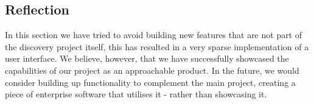 \subsection{Reflection}\label{subsec:reflection}
In this section we have tried to avoid building new features that are not part of the discovery project itself, this has
resulted in a very sparse implementation of a user interface.
We believe, however, that we have successfully showcased the capabilities of our project as an approachable product.
In the future, we would consider building up functionality to complement the main project, creating a piece of
enterprise software that utilises it - rather than showcasing it.
